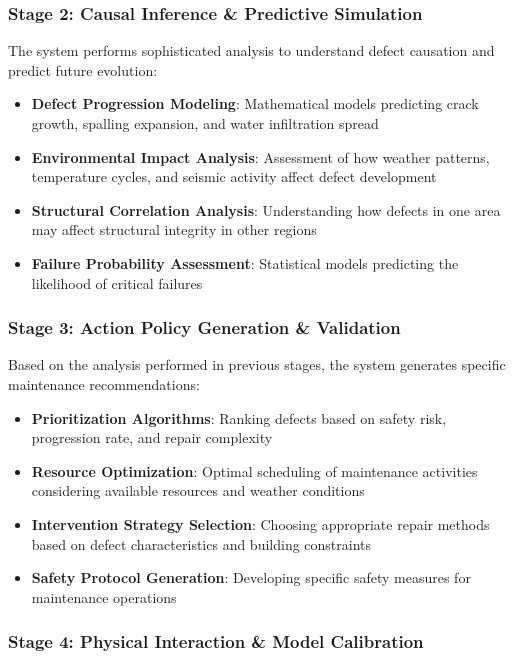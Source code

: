 \subsubsection{Stage 2: Causal Inference \& Predictive Simulation}

The system performs sophisticated analysis to understand defect causation and predict future evolution:

\begin{itemize}
    \item \textbf{Defect Progression Modeling}: Mathematical models predicting crack growth, spalling expansion, and water infiltration spread
    \item \textbf{Environmental Impact Analysis}: Assessment of how weather patterns, temperature cycles, and seismic activity affect defect development
    \item \textbf{Structural Correlation Analysis}: Understanding how defects in one area may affect structural integrity in other regions
    \item \textbf{Failure Probability Assessment}: Statistical models predicting the likelihood of critical failures
\end{itemize}

\subsubsection{Stage 3: Action Policy Generation \& Validation}

Based on the analysis performed in previous stages, the system generates specific maintenance recommendations:

\begin{itemize}
    \item \textbf{Prioritization Algorithms}: Ranking defects based on safety risk, progression rate, and repair complexity
    \item \textbf{Resource Optimization}: Optimal scheduling of maintenance activities considering available resources and weather conditions
    \item \textbf{Intervention Strategy Selection}: Choosing appropriate repair methods based on defect characteristics and building constraints
    \item \textbf{Safety Protocol Generation}: Developing specific safety measures for maintenance operations
\end{itemize}

\subsubsection{Stage 4: Physical Interaction \& Model Calibration}

